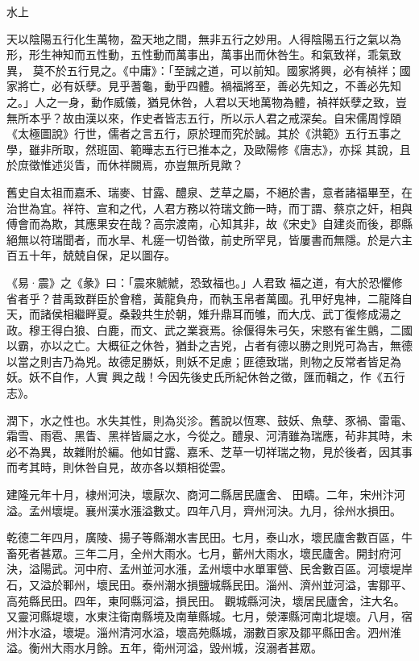 
\begin{pinyinscope}

 水上



 天以陰陽五行化生萬物，盈天地之間，無非五行之妙用。人得陰陽五行之氣以為形，形生神知而五性動，五性動而萬事出，萬事出而休咎生。和氣致祥，乖氣致異，
 莫不於五行見之。《中庸》：「至誠之道，可以前知。國家將興，必有禎祥；國家將亡，必有妖孽。見乎蓍龜，動乎四體。禍福將至，善必先知之，不善必先知之。」人之一身，動作威儀，猶見休咎，人君以天地萬物為體，禎祥妖孽之致，豈無所本乎？故由漢以來，作史者皆志五行，所以示人君之戒深矣。自宋儒周惇頤《太極圖說》行世，儒者之言五行，原於理而究於誠。其於《洪範》五行五事之學，雖非所取，然班固、範曄志五行已推本之，及歐陽修《唐志》，亦採
 其說，且於庶徵惟述災眚，而休祥闕焉，亦豈無所見歟？



 舊史自太祖而嘉禾、瑞麥、甘露、醴泉、芝草之屬，不絕於書，意者諸福畢至，在治世為宜。祥符、宣和之代，人君方務以符瑞文飾一時，而丁謂、蔡京之奸，相與傅會而為欺，其應果安在哉？高宗渡南，心知其非，故《宋史》自建炎而後，郡縣絕無以符瑞聞者，而水旱、札瘥一切咎徵，前史所罕見，皆屢書而無隱。於是六主百五十年，兢兢自保，足以圖存。



 《易·震》之《彖》曰：「震來虩虩，恐致福也。」人君致
 福之道，有大於恐懼修省者乎？昔禹致群臣於會稽，黃龍負舟，而執玉帛者萬國。孔甲好鬼神，二龍降自天，而諸侯相繼畔夏。桑穀共生於朝，雉升鼎耳而雊，而大戊、武丁復修成湯之政。穆王得白狼、白鹿，而文、武之業衰焉。徐偃得朱弓矢，宋愍有雀生鸇，二國以霸，亦以之亡。大概征之休咎，猶卦之吉兇，占者有德以勝之則兇可為吉，無德以當之則吉乃為兇。故德足勝妖，則妖不足慮；匪德致瑞，則物之反常者皆足為妖。妖不自作，人實
 興之哉！今因先後史氏所紀休咎之徵，匯而輯之，作《五行志》。



 潤下，水之性也。水失其性，則為災沴。舊說以恆寒、鼓妖、魚孽、豕禍、雷電、霜雪、雨雹、黑眚、黑祥皆屬之水，今從之。醴泉、河清雖為瑞應，茍非其時，未必不為異，故雜附於編。他如甘露、嘉禾、芝草一切祥瑞之物，見於後者，因其事而考其時，則休咎自見，故亦各以類相從雲。



 建隆元年十月，棣州河決，壞厭次、商河二縣居民廬舍、
 田疇。二年，宋州汴河溢。孟州壞堤。襄州漢水漲溢數丈。四年八月，齊州河決。九月，徐州水損田。



 乾德二年四月，廣陵、揚子等縣潮水害民田。七月，泰山水，壞民廬舍數百區，牛畜死者甚眾。三年二月，全州大雨水。七月，蘄州大雨水，壞民廬舍。開封府河決，溢陽武。河中府、孟州並河水漲，孟州壞中水單軍營、民舍數百區。河壞堤岸石，又溢於鄆州，壞民田。泰州潮水損鹽城縣民田。淄州、濟州並河溢，害鄒平、高苑縣民田。四年，東阿縣河溢，損民田。
 觀城縣河決，壞居民廬舍，注大名。又靈河縣堤壞，水東注衛南縣境及南華縣城。七月，滎澤縣河南北堤壞。八月，宿州汴水溢，壞堤。淄州清河水溢，壞高苑縣城，溺數百家及鄒平縣田舍。泗州淮溢。衡州大雨水月餘。五年，衛州河溢，毀州城，沒溺者甚眾。




\end{pinyinscope}
